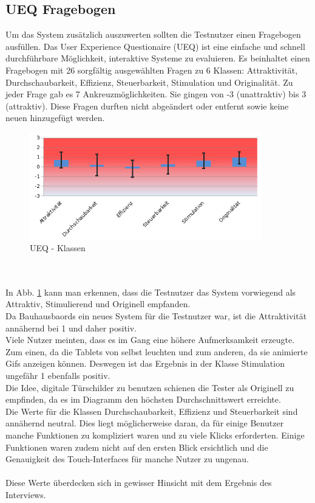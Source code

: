 \subsection{UEQ Fragebogen}\label{UEQ Fragebogen}
Um das System zusätzlich auszuwerten sollten die Testnutzer einen Fragebogen ausfüllen.
Das User Experience Questionaire (UEQ) ist eine einfache und schnell durchführbare Möglichkeit, interaktive Systeme zu evaluieren.
Es beinhaltet einen Fragebogen mit 26 sorgfältig ausgewählten Fragen zu 6 Klassen: Attraktivität, Durchschaubarkeit, Effizienz, Steuerbarkeit, Stimulation und Originalität.
Zu jeder Frage gab es 7 Ankreuzmöglichkeiten. Sie gingen von -3 (unattraktiv) bis 3 (attraktiv).
Diese Fragen durften nicht abgeändert oder entfernt sowie keine neuen hinzugefügt werden.
\begin{figure}[h!]
  \centering
    \includegraphics[width=0.9\textwidth]{./img/UEQ_Scales.png}
  \caption{UEQ - Klassen}
  \label{img:UEQScales}
\end{figure}
\\
\\
In Abb. \ref{img:UEQScales} kann man erkennen, dass die Testnutzer das System vorwiegend als Attraktiv, Stimulierend und Originell empfanden.
\\
Da Bauhausbaords ein neues System für die Testnutzer war, ist die Attraktivität annähernd bei 1 und daher positiv.
\\
Viele Nutzer meinten, dass es im Gang eine höhere Aufmerksamkeit erzeugte. Zum einen, da die Tablets von selbst leuchten und zum anderen, da sie animierte Gifs anzeigen können. Deswegen ist das Ergebnis in der Klasse Stimulation ungefähr 1 ebenfalls positiv.
\\
Die Idee, digitale Türschilder zu benutzen schienen die Tester als Originell zu empfinden, da es im Diagramm den höchsten Durchschnittswert erreichte.
\\
Die Werte für die Klassen Durchschaubarkeit, Effizienz und Steuerbarkeit sind annähernd neutral.
Dies liegt möglicherweise daran, da für einige Benutzer manche Funktionen zu kompliziert waren und zu viele Klicks erforderten.
Einige Funktionen waren zudem nicht auf den ersten Blick ersichtlich und die Genauigkeit des Touch-Interfaces für manche Nutzer zu ungenau.
\\
\\
Diese Werte überdecken sich in gewisser Hinsicht mit dem Ergebnis des Interviews.



